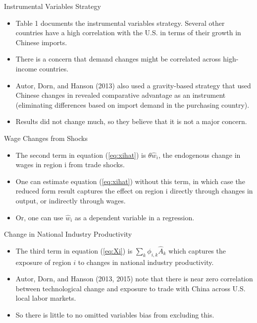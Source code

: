 \documentclass[aspectratio=169]{beamer}
\begin{document}

\begin{frame}{Instrumental Variables Strategy}

\begin{itemize}
    \item<1-> Table 1 documents the instrumental variables strategy.  Several other countries have a high correlation with the U.S. in terms of their growth in Chinese imports.
    \item<2-> There is a concern that demand changes might be correlated across high-income countries.
    \item<3-> Autor, Dorn, and Hanson (2013) also used a gravity-based strategy that used Chinese changes in revealed comparative advantage as an instrument (eliminating differences based on import demand in the purchasing country).
    \item<4-> Results did not change much, so they believe that it is not a major concern.
\end{itemize}
    
\end{frame}


\begin{frame}{Wage Changes from Shocks}

\begin{itemize}
    \item<1-> The second term in equation (\ref{eq:xihat}) is $ \theta \hat{w}_{i} $, the endogenous change in wages in region i from trade shocks.
    \item<2-> One can estimate equation (\ref{eq:xihat}) without this term, in which case the reduced form result captures the effect on region i directly through changes in output, or indirectly through wages.
    \item<3-> Or, one can use $ \hat{w}_{i} $ as a dependent variable in a regression.
\end{itemize}
    
\end{frame}


\begin{frame}{Change in National Industry Productivity}

\begin{itemize}
    \item<1-> The third term in equation (\ref{eq:Xi}) is $ \sum_{k} \phi_{i,k} \hat{A}_{k} $ which captures the exposure of region $ i $ to changes in national industry productivity.
    \item<2-> Autor, Dorn, and Hanson (2013, 2015) note that there is near zero correlation between technological change and exposure to trade with China across U.S. local labor markets.
    \item<3->  So there is little to no omitted variables bias from excluding this.
\end{itemize}
    
\end{frame}
\end{document}
